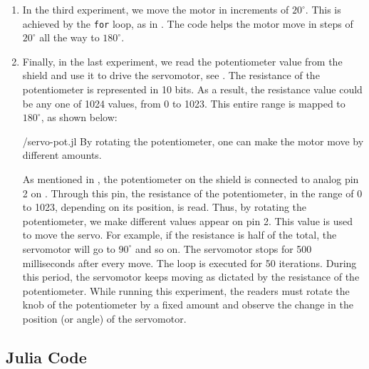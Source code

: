 \begin{enumerate}
        
  \item In the third experiment, we move the motor in increments of
        $20^\circ$.  This is achieved by the {\tt for} loop, as in
        . The code helps the motor move in steps of $20^\circ$ all
        the way to $180^\circ$.  
        
  \item Finally, in the last experiment, we read the potentiometer value
        from the shield and use it to drive the servomotor, see
        .  The resistance of the potentiometer is
        represented in 10 bits.  As a result, the resistance value could be
        any one of 1024 values, from 0 to 1023.  This entire range is
        mapped to $180^\circ$, as shown below:
        
        {\LocSERjuliacode/servo-pot.jl}
        By rotating the potentiometer, one can make
        the motor move by different amounts.
        
        As mentioned in , the potentiometer on the shield is connected 
        to analog pin 2 on \arduino. Through this pin, the resistance of the potentiometer, in the range of 0 to 1023,
        depending on its position, is read.  Thus, by rotating the
        potentiometer, we make different values appear on pin 2.  This value
        is used to move the servo.  For example, if the resistance is half
        of the total, the servomotor will go to $90^\circ$ and so on.  The
        servomotor stops for 500 milliseconds after every move.  The loop is
        executed for 50 iterations. During this period, the servomotor keeps moving as dictated by the
        resistance of the potentiometer. While running this experiment, the readers 
        must rotate the knob of the potentiometer by a fixed amount and observe 
        the change in the position (or angle) of the servomotor.   
        
\end{enumerate}

\subsection{Julia Code}
\lstset{style=mystyle}
\label{sec:servo-julia-code}

